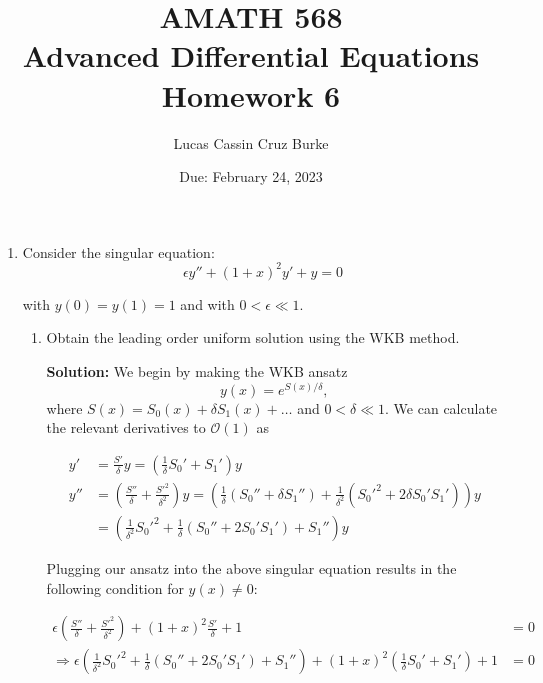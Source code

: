 \documentclass[12pt, a4paper]{article}
\begin{document}
\title{{AMATH 568\\
Advanced Differential Equations}\\
{\bf \Huge Homework 6}}

\author{Lucas Cassin Cruz Burke}

\date{Due: February 24, 2023}

\maketitle

\begin{enumerate}
    \item Consider the singular equation: $$\epsilon y'' + (1+x)^2 y' + y = 0$$
    
    with $y(0)=y(1)=1$ and with $0<\epsilon \ll 1$. 

    \begin{enumerate}
        \item Obtain the leading order uniform solution using the WKB method. 
        
        \textbf{Solution:} We begin by making the WKB ansatz $$y(x) = e^{S(x)/\delta},$$ where $S(x) = S_0(x) + \delta S_1(x) + \dots$ and $0 < \delta \ll 1$. We can calculate the relevant derivatives to $\mathcal O (1)$ as 

        \begin{align*}
            y' &= \frac{S'}{\delta} y = \left(\frac{1}{\delta}S_0' + S_1'\right) y \\ y'' &= \left( \frac{S''}{\delta}  + \frac{{S'}^2}{\delta^2} \right) y = \left( \frac{1}{\delta}(S_0'' + \delta S_1'') + \frac{1}{\delta^2}({S_0'}^2 + 2\delta S_0'S_1') \right) y \\
            &= \left( \frac{1}{\delta^2} {S_0'}^2 + \frac{1}{\delta}(S_0'' + 2 S_0'S_1') + S_1'' \right) y
        \end{align*}

        Plugging our ansatz into the above singular equation results in the following condition for $y(x) \ne 0$:

        \begin{align*}
            \epsilon \left( \frac{S''}{\delta}  + \frac{{S'}^2}{\delta^2} \right) + (1+x)^2 \frac{S'}{\delta} + 1 &=0 \\
            \Rightarrow \epsilon \left( \frac{1}{\delta^2} {S_0'}^2 + \frac{1}{\delta}(S_0'' + 2 S_0'S_1') + S_1'' \right) + (1+x)^2 \left(\frac{1}{\delta}S_0' + S_1'\right) + 1 &=0
        \end{align*}


\end{enumerate}
\end{enumerate}
\end{document}
